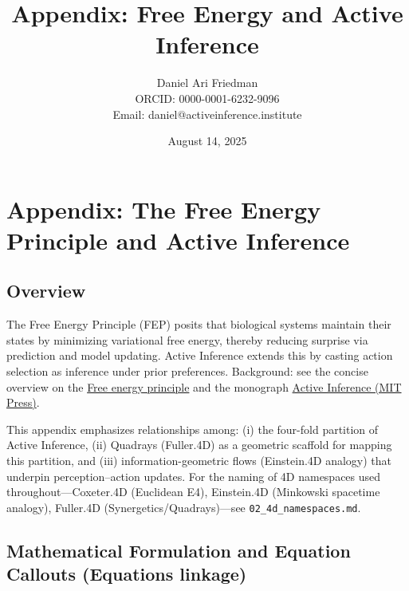 \documentclass[
]{article}
\title{Appendix: Free Energy and Active Inference}
\author{Daniel Ari Friedman\\ ORCID: 0000-0001-6232-9096\\ Email: daniel@activeinference.institute}
\date{August 14, 2025}
\begin{document}
\maketitle

\hypertarget{appendix-the-free-energy-principle-and-active-inference}{%
\section{Appendix: The Free Energy Principle and Active
Inference}\label{appendix-the-free-energy-principle-and-active-inference}}

\hypertarget{overview}{%
\subsection{Overview}\label{overview}}

The Free Energy Principle (FEP) posits that biological systems maintain
their states by minimizing variational free energy, thereby reducing
surprise via prediction and model updating. Active Inference extends
this by casting action selection as inference under prior preferences.
Background: see the concise overview on the
\href{https://en.wikipedia.org/wiki/Free_energy_principle}{Free energy
principle} and the monograph
\href{https://direct.mit.edu/books/oa-monograph/5299/Active-InferenceThe-Free-Energy-Principle-in-Mind}{Active
Inference (MIT Press)}.

This appendix emphasizes relationships among: (i) the four-fold
partition of Active Inference, (ii) Quadrays (Fuller.4D) as a geometric
scaffold for mapping this partition, and (iii) information-geometric
flows (Einstein.4D analogy) that underpin perception--action updates.
For the naming of 4D namespaces used throughout---Coxeter.4D (Euclidean
E4), Einstein.4D (Minkowski spacetime analogy), Fuller.4D
(Synergetics/Quadrays)---see \texttt{02\_4d\_namespaces.md}.

\hypertarget{mathematical-formulation-and-equation-callouts-equations-linkage}{%
\subsection{Mathematical Formulation and Equation Callouts (Equations
linkage)}\label{mathematical-formulation-and-equation-callouts-equations-linkage}}
\end{document}
